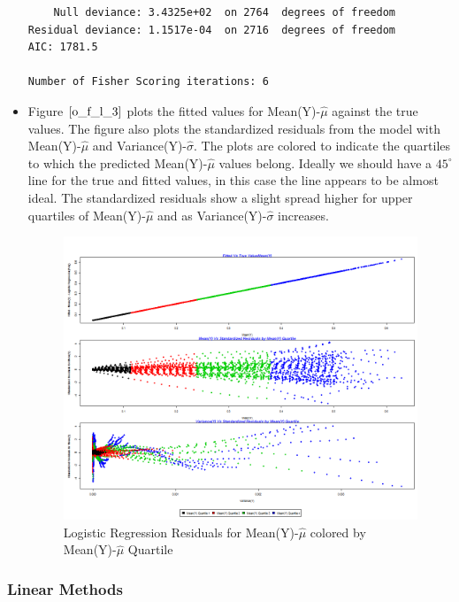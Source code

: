 \documentclass[twoside,12pt]{article}
\begin{document}
\begin{itemize}
\begin{verbatim}
    Null deviance: 3.4325e+02  on 2764  degrees of freedom
Residual deviance: 1.1517e-04  on 2716  degrees of freedom
AIC: 1781.5

Number of Fisher Scoring iterations: 6

\end{verbatim}

\FloatBarrier
\item
Figure $\eqref{o_f_l_3}$ plots the fitted values for Mean(Y)-$\hat{\mu}$ against the true values. The figure also plots the standardized residuals from the model with Mean(Y)-$\hat{\mu}$ and Variance(Y)-$\hat{\sigma}$. The plots are colored to indicate the quartiles to which the predicted Mean(Y)-$\hat{\mu}$ values belong. Ideally we should have a $45^{\circ}$ line for the true and fitted values, in this case the line appears to be almost ideal. The standardized residuals show a slight spread higher for upper quartiles of Mean(Y)-$\hat{\mu}$ and as Variance(Y)-$\hat{\sigma}$ increases.
\FloatBarrier
\begin{figure}[!htbp]
\centering
\includegraphics[scale=.50]{images/mt_rse_plot_mean_trg_lr_poly.png} 
\caption{Logistic Regression Residuals for Mean(Y)-$\hat{\mu}$ colored by Mean(Y)-$\hat{\mu}$ Quartile}
\label{o_f_l_3}
\end{figure}


\end{itemize}


\FloatBarrier
\subsubsection{Linear Methods}
\end{document}
